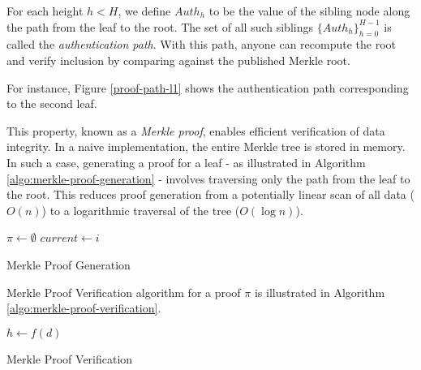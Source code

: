For each height $h < H$, we define $Auth_h$ to be the value of the sibling node along the path from the leaf to the root. The set of all such siblings $\{Auth_h\}_{h=0}^{H-1}$ is called the \emph{authentication path}. With this path, anyone can recompute the root and verify inclusion by comparing against the published Merkle root.

For instance, Figure \ref{proof-path-l1} shows the authentication path corresponding to the second leaf.

This property, known as a \emph{Merkle proof}, enables efficient verification of data integrity. In a naive implementation, the entire Merkle tree is stored in memory. In such a case, generating a proof for a leaf - as illustrated in Algorithm \ref{algo:merkle-proof-generation} - involves traversing only the path from the leaf to the root. This reduces proof generation from a potentially linear scan of all data ($O(n)$) to a logarithmic traversal of the tree ($O(\log n)$).

\vspace{1em}
\begin{algorithm}[H]
\SetAlgoLined
\DontPrintSemicolon
{}
\BlankLine
$\pi \gets \emptyset$\;
$current \gets i$\;
\Return{$\pi$}\;
\caption{Merkle Proof Generation}
\label{algo:merkle-proof-generation}
\end{algorithm}

\vspace{1em}

Merkle Proof Verification algorithm for a proof $\pi$ is illustrated in Algorithm \ref{algo:merkle-proof-verification}.

 \vspace{1em}

\begin{algorithm}[H]
\SetAlgoLined
\DontPrintSemicolon
{}
\BlankLine
$h \gets f(d)$\;
\;
\caption{Merkle Proof Verification}
\label{algo:merkle-proof-verification}
\end{algorithm}

